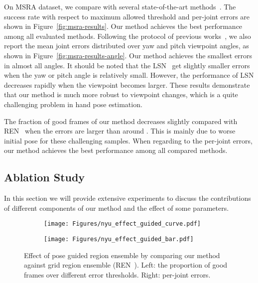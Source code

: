 \documentclass[final, 5p]{elsarticle}
\begin{document}
On MSRA dataset, we compare with several state-of-the-art methods~\cite{sun2015cascaded, ge2016robust, ge2017threedcnn, wan2016hand, madadi2017occlusion, wang2018region}. The success rate with respect to maximum allowed threshold and per-joint errors are shown in Figure~\ref{fig:msra-results}. Our method achieves the best performance among all evaluated methods. Following the protocol of previous works~\cite{sun2015cascaded}, we also report the mean joint errors distributed over yaw and pitch viewpoint angles, as shown in Figure~\ref{fig:msra-results-angle}. Our method achieves the smallest errors in almost all angles. It should be noted that the LSN~\cite{wan2016hand} get slightly smaller errors when the yaw or pitch angle is relatively small. However, the performance of LSN decreases rapidly when the viewpoint becomes larger. These results demonstrate that our method is much more robust to viewpoint changes, which is a quite challenging problem in hand pose estimation.

The fraction of good frames of our method decreases slightly compared with REN~\cite{wang2018region} when the errors are larger than around . This is mainly due to worse initial pose for these challenging samples.
When regarding to the per-joint errors, our method achieves the best performance among all compared methods.

\subsection{Ablation Study}
\label{sec:ablation}
In this section we will provide extensive experiments to discuss the contributions of different components of our method and the effect of some parameters.

\begin{figure*}[!tb]
  \centering
  \begin{subfigure}[t]{0.5\textwidth}
    \centering
    \centerline{\texttt{[image: Figures/nyu\_effect\_guided\_curve.pdf]}}
  \end{subfigure}\begin{subfigure}[t]{0.5\textwidth}
    \centering
    \centerline{\texttt{[image: Figures/nyu\_effect\_guided\_bar.pdf]}}
  \end{subfigure}\caption{Effect of pose guided region ensemble by comparing our method against grid region ensemble (REN~\cite{guo2017region}).  Left: the proportion of good frames over different error thresholds. Right: per-joint errors.}
\label{fig:nyu-ablation-guided}
\end{figure*}
\end{document}
